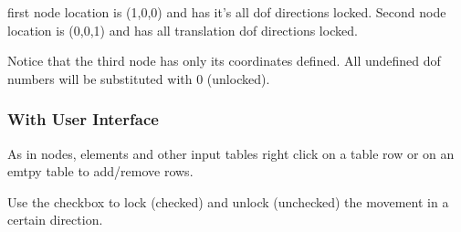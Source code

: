 \documentclass[letterpaper,10pt,english]{sphinxmanual}
\begin{document}
\begin{sphinxVerbatim}[commandchars=\\\{\}]
\end{sphinxVerbatim}

first node location is (\sphinxhyphen{}1,0,0) and has it’s all dof directions locked. Second node location is (0,0,\sphinxhyphen{}1) and has all
translation dof directions locked.

Notice that the third node has only its coordinates defined. All undefined dof numbers will be substituted
with 0 (unlocked).


\subsubsection{With User Interface}
\label{\detokenize{making_a_model:with-user-interface}}
As in nodes, elements and other input tables
right click on a table row or on an emtpy table to add/remove rows.

Use the checkbox to lock (checked) and
unlock (unchecked) the movement in a certain direction.
\end{document}
